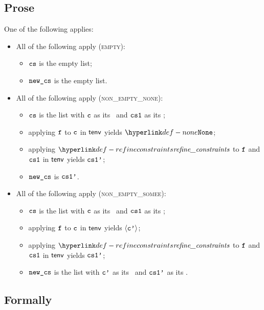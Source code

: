\subsection{Prose}
One of the following applies:
\begin{itemize}
  \item All of the following apply (\textsc{empty}):
  \begin{itemize}
    \item $\cs$ is the empty list;
    \item $\newcs$ is the empty list.
  \end{itemize}

  \item All of the following apply (\textsc{non\_empty\_none}):
  \begin{itemize}
    \item $\cs$ is the list with $\vc$ as its \head\ and $\csone$ as its \tail;
    \item applying $\vf$ to $\vc$ in $\tenv$ yields $\None$;
    \item applying $\refineconstraints$ to $\vf$ and $\csone$ in $\tenv$ yields $\csonep$;
    \item $\newcs$ is $\csonep$.
  \end{itemize}

  \item All of the following apply (\textsc{non\_empty\_somee}):
  \begin{itemize}
    \item $\cs$ is the list with $\vc$ as its \head\ and $\csone$ as its \tail;
    \item applying $\vf$ to $\vc$ in $\tenv$ yields $\langle\vcp\rangle$;
    \item applying $\refineconstraints$ to $\vf$ and $\csone$ in $\tenv$ yields $\csonep$;
    \item $\newcs$ is the list with $\vcp$ as its \head\ and $\csonep$ as its \tail.
  \end{itemize}
\end{itemize}

\subsection{Formally}
\begin{mathpar}
\end{mathpar}

